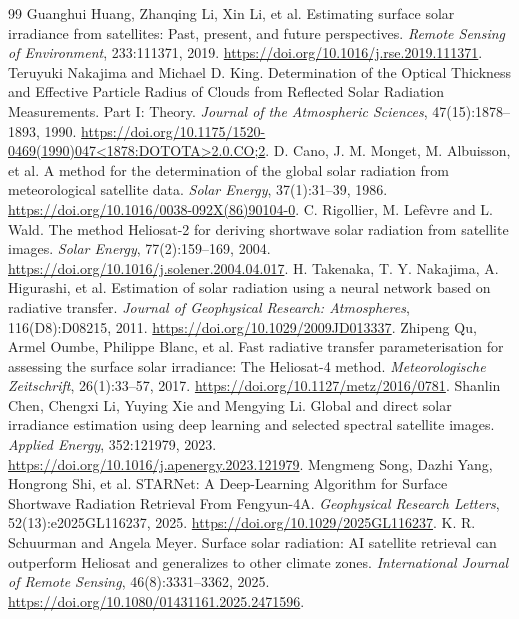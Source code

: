 \documentclass[11pt]{article}
\begin{document}
\begin{thebibliography}{99}\small
{}
Guanghui Huang, Zhanqing Li, Xin Li, et al.
Estimating surface solar irradiance from satellites: Past, present, and future perspectives.
\textit{Remote Sensing of Environment}, 233:111371, 2019.
\url{https://doi.org/10.1016/j.rse.2019.111371}.
Teruyuki Nakajima and Michael D. King.
Determination of the Optical Thickness and Effective Particle Radius of Clouds from Reflected Solar Radiation Measurements. Part I: Theory.
\textit{Journal of the Atmospheric Sciences}, 47(15):1878--1893, 1990.
\url{https://doi.org/10.1175/1520-0469(1990)047<1878:DOTOTA>2.0.CO;2}.
D. Cano, J. M. Monget, M. Albuisson, et al.
A method for the determination of the global solar radiation from meteorological satellite data.
\textit{Solar Energy}, 37(1):31--39, 1986.
\url{https://doi.org/10.1016/0038-092X(86)90104-0}.
C. Rigollier, M. Lef\`{e}vre and L. Wald.
The method Heliosat-2 for deriving shortwave solar radiation from satellite images.
\textit{Solar Energy}, 77(2):159--169, 2004.
\url{https://doi.org/10.1016/j.solener.2004.04.017}.
H. Takenaka, T. Y. Nakajima, A. Higurashi, et al.
Estimation of solar radiation using a neural network based on radiative transfer.
\textit{Journal of Geophysical Research: Atmospheres}, 116(D8):D08215, 2011.
\url{https://doi.org/10.1029/2009JD013337}.
Zhipeng Qu, Armel Oumbe, Philippe Blanc, et al.
Fast radiative transfer parameterisation for assessing the surface solar irradiance: The Heliosat-4 method.
\textit{Meteorologische Zeitschrift}, 26(1):33--57, 2017.
\url{https://doi.org/10.1127/metz/2016/0781}.
Shanlin Chen, Chengxi Li, Yuying Xie and Mengying Li.
Global and direct solar irradiance estimation using deep learning and selected spectral satellite images.
\textit{Applied Energy}, 352:121979, 2023.
\url{https://doi.org/10.1016/j.apenergy.2023.121979}.
Mengmeng Song, Dazhi Yang, Hongrong Shi, et al.
STARNet: A Deep-Learning Algorithm for Surface Shortwave Radiation Retrieval From Fengyun-4A.
\textit{Geophysical Research Letters}, 52(13):e2025GL116237, 2025.
\url{https://doi.org/10.1029/2025GL116237}.
K. R. Schuurman and Angela Meyer.
Surface solar radiation: AI satellite retrieval can outperform Heliosat and generalizes to other climate zones.
\textit{International Journal of Remote Sensing}, 46(8):3331--3362, 2025.
\url{https://doi.org/10.1080/01431161.2025.2471596}.

\end{thebibliography}
\end{document}

